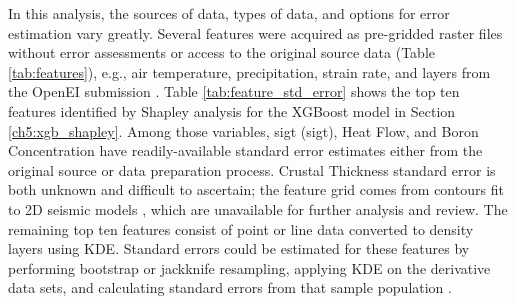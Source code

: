 In this analysis, the sources of data, types of data, and options for error estimation vary greatly. Several features were acquired as pre-gridded raster files without error assessments or access to the original source data (Table \ref{tab:features}), e.g., air temperature, precipitation, strain rate, and layers from the \citeauthor{bielicki_hydrogeolgic_2015} OpenEI submission \citep{kelley_geothermal_2015}. Table \ref{tab:feature_std_error} shows the top ten features identified by Shapley analysis for the XGBoost model in Section \ref{ch5:xgb_shapley}. Among those variables, \acrlong{sigt} (\acrshort{sigt}), Heat Flow, and Boron Concentration have readily-available standard error estimates either from the original source or data preparation process. Crustal Thickness standard error is both unknown and difficult to ascertain; the feature grid comes from contours fit to 2D seismic models \citep{keller_comparative_1991}, which are unavailable for further analysis and review. The remaining top ten features consist of point or line data converted to density layers using KDE. Standard errors could be estimated for these features by performing bootstrap or jackknife resampling, applying KDE on the derivative data sets, and calculating standard errors from that sample population .


